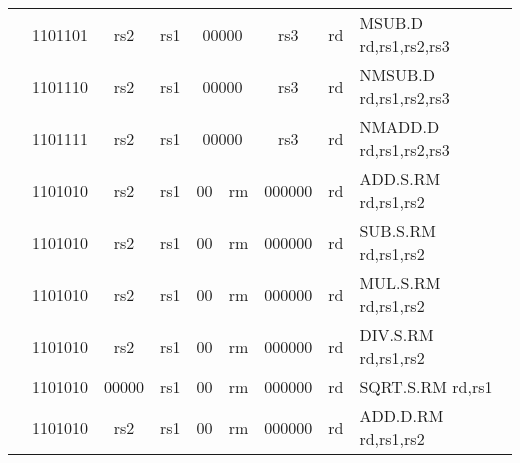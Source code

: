 \begin{table}[p]
\begin{small}
\begin{center}
\begin{tabular}{rcccccccccccl}
&
\multicolumn{2}{|c|}{1101101} &
\multicolumn{1}{c|}{rs2} &
\multicolumn{1}{c|}{rs1} &
\multicolumn{4}{c|}{00000} &
\multicolumn{2}{c|}{rs3} &
\multicolumn{1}{c|}{rd} & MSUB.D rd,rs1,rs2,rs3 \\
\cline{2-12}
  

&
\multicolumn{2}{|c|}{1101110} &
\multicolumn{1}{c|}{rs2} &
\multicolumn{1}{c|}{rs1} &
\multicolumn{4}{c|}{00000} &
\multicolumn{2}{c|}{rs3} &
\multicolumn{1}{c|}{rd} & NMSUB.D rd,rs1,rs2,rs3 \\
\cline{2-12}
  

&
\multicolumn{2}{|c|}{1101111} &
\multicolumn{1}{c|}{rs2} &
\multicolumn{1}{c|}{rs1} &
\multicolumn{4}{c|}{00000} &
\multicolumn{2}{c|}{rs3} &
\multicolumn{1}{c|}{rd} & NMADD.D rd,rs1,rs2,rs3 \\
\cline{2-12}
  

&
\multicolumn{2}{|c|}{1101010} &
\multicolumn{1}{c|}{rs2} &
\multicolumn{1}{c|}{rs1} &
\multicolumn{1}{c|}{00} &
\multicolumn{2}{c|}{rm} &
\multicolumn{3}{c|}{000000} &
\multicolumn{1}{c|}{rd} & ADD.S.RM rd,rs1,rs2 \\
\cline{2-12}
  

&
\multicolumn{2}{|c|}{1101010} &
\multicolumn{1}{c|}{rs2} &
\multicolumn{1}{c|}{rs1} &
\multicolumn{1}{c|}{00} &
\multicolumn{2}{c|}{rm} &
\multicolumn{3}{c|}{000000} &
\multicolumn{1}{c|}{rd} & SUB.S.RM rd,rs1,rs2 \\
\cline{2-12}
  

&
\multicolumn{2}{|c|}{1101010} &
\multicolumn{1}{c|}{rs2} &
\multicolumn{1}{c|}{rs1} &
\multicolumn{1}{c|}{00} &
\multicolumn{2}{c|}{rm} &
\multicolumn{3}{c|}{000000} &
\multicolumn{1}{c|}{rd} & MUL.S.RM rd,rs1,rs2 \\
\cline{2-12}
  

&
\multicolumn{2}{|c|}{1101010} &
\multicolumn{1}{c|}{rs2} &
\multicolumn{1}{c|}{rs1} &
\multicolumn{1}{c|}{00} &
\multicolumn{2}{c|}{rm} &
\multicolumn{3}{c|}{000000} &
\multicolumn{1}{c|}{rd} & DIV.S.RM rd,rs1,rs2 \\
\cline{2-12}
  

&
\multicolumn{2}{|c|}{1101010} &
\multicolumn{1}{c|}{00000} &
\multicolumn{1}{c|}{rs1} &
\multicolumn{1}{c|}{00} &
\multicolumn{2}{c|}{rm} &
\multicolumn{3}{c|}{000000} &
\multicolumn{1}{c|}{rd} & SQRT.S.RM rd,rs1 \\
\cline{2-12}
  

&
\multicolumn{2}{|c|}{1101010} &
\multicolumn{1}{c|}{rs2} &
\multicolumn{1}{c|}{rs1} &
\multicolumn{1}{c|}{00} &
\multicolumn{2}{c|}{rm} &
\multicolumn{3}{c|}{000000} &
\multicolumn{1}{c|}{rd} & ADD.D.RM rd,rs1,rs2 \\
\cline{2-12}
  


\end{tabular}
\end{center}
\end{small}
\end{table}
